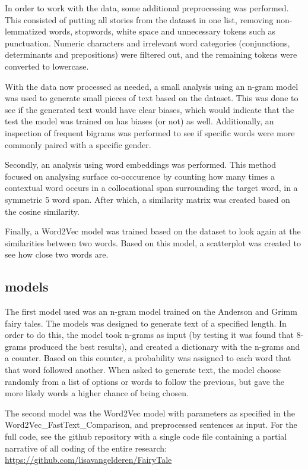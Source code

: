 \documentclass[11pt]{article}
\begin{document}
In order to work with the data, some additional preprocessing was performed. This consisted of putting all stories from the dataset in one list, removing non-lemmatized words, stopwords, white space and unnecessary tokens such as punctuation. Numeric characters and irrelevant word categories (conjunctions, determinants and prepositions) were filtered out, and the remaining tokens were converted to lowercase.\par
With the data now processed as needed, a small analysis using an n-gram model was used to generate small pieces of text based on the dataset. This was done to see if the generated text would have clear biases, which would indicate that the test the model was trained on has biases (or not) as well. Additionally, an inspection of frequent bigrams was performed to see if specific words were more commonly paired with a specific gender.  \par
Secondly, an analysis using word embeddings was performed. This method focused on analysing surface co-occcurence by counting how many times a contextual word occurs in a collocational span surrounding the target word, in a symmetric 5 word span. After which, a similarity matrix was created based on the cosine similarity. \par
Finally, a Word2Vec model was trained based on the dataset to look again at the similarities between two words. Based on this model, a scatterplot was created to see how close two words are. 

\subsection{models}

The first model used was an n-gram model trained on the Anderson and Grimm fairy tales. The models was designed to generate text of a specified length. In order to do this, the model took n-grams as input (by testing it was found that 8-grams produced the best results), and created a dictionary with the n-grams and a counter. Based on this counter, a probability was assigned to each word that that word followed another. When asked to generate text, the model choose randomly from a list of options or words to follow the previous, but gave the more likely words a higher chance of being chosen. \par
The second model was the Word2Vec model with parameters as specified in the Word2Vec\_FastText\_Comparison, and preprocessed sentences as input. For the full code, see the github repository with a single code file containing a partial narrative of all coding of the entire research: \url{https://github.com/lisavangelderen/FairyTale} 
\end{document}
